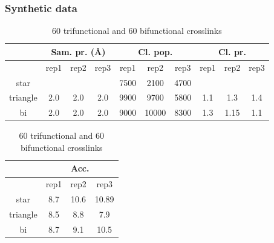 \documentclass[a4paper,8pt]{beamer}
\begin{document}
\begin{frame}
  \frametitle{Synthetic data}
  \begin{table}[htbp]
    \centering
    \caption{60 trifunctional and 60 bifunctional crosslinks}
    \begin{tabular}{|c|ccc|ccc|ccc|}
        \hline
        & \multicolumn{3}{c|}{Sam. pr. ({\AA})} 
        & \multicolumn{3}{c|}{Cl. pop.} 
        & \multicolumn{3}{c|}{Cl. pr.} \\ \hline
        & rep1 & rep2 & rep3 
        & rep1 & rep2 & rep3 
        & rep1 & rep2 & rep3 \\ \hline
        star 
          &  &  &  
          & 7500  & 2100 & 4700
          &  &  & \\ \hline
        triangle 
          & 2.0 & 2.0 & 2.0
          & 9900 &  9700 & 5800 
          & 1.1  & 1.3 & 1.4 \\ \hline
        bi 
          & 2.0 & 2.0 & 2.0  
          & 9000 & 10000 & 8300 
          & 1.3 & 1.15 & 1.1  \\ \hline
    \end{tabular}
  \end{table}
  \begin{table}[htbp]
    \centering
    \caption{60 trifunctional and 60 bifunctional crosslinks}
    \begin{tabular}{|c|ccc|}
        \hline 
        & \multicolumn{3}{c|}{Acc.} \\ \hline
        & rep1 & rep2 & rep3 \\ \hline
        star 
          & 8.7  & 10.6 & 10.89 \\ \hline
        triangle 
          & 8.5 & 8.8 & 7.9 \\ \hline
        bi 
          & 8.7 & 9.1 &  10.5\\ \hline
    \end{tabular}
  \end{table}
  \end{frame}
\end{document}
